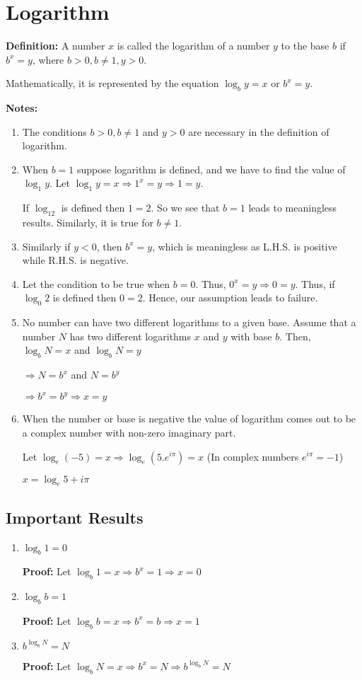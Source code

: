 \chapter{Logarithm}
\textbf{Definition:} A number $x$ is called the logarithm of a number $y$ to the base $b$ if $b^x = y$, where $b > 0, b\neq 1, y > 0$.

\noindent Mathematically, it is represented by the equation $\log_b y = x$ or $b^x = y$.

\textbf{Notes:}
\begin{enumerate}
\item The conditions $b>0, b\neq 1$ and $y>0$ are necessary in the definition of logarithm.
\item When $b=1$ suppose logarithm is defined, and we have to find the value of $\log_1y$. Let
  $\log_1y=x\Rightarrow 1^x=y\Rightarrow 1=y$.

  If $\log_12$ is defined then $1 = 2$. So we see that $b = 1$ leads to meaningless results. Similarly, it is true for $b \neq 1$.
\item Similarly if $y < 0$, then $b^x = y$, which is meaningless as L.H.S. is positive while R.H.S. is negative.
\item Let the condition to be true when $b = 0$. Thus, $0^x = y\Rightarrow 0 = y$. Thus, if $\log_0 2$ is defined then $0 =
  2$. Hence, our assumption leads to failure.
\item No number can have two different logarithms to a given base. Assume that a number $N$ has two different logarithms $x$ and
  $y$ with base $b$. Then, $\log_b N = x$ and $\log_b N = y$

  $\Rightarrow N = b^x$ and $N = b^y$

  $\Rightarrow b^x = b^y \Rightarrow x = y$
\item When the number or base is negative the value of logarithm comes out to be a complex number with non-zero imaginary part.

  Let $\log_e(-5) = x \Rightarrow \log_e(5.e^{i\pi}) = x$ (In complex numbers $e^{i\pi} = -1$)

  $x = \log_e5 + i\pi$
\end{enumerate}

\section{Important Results}
\begin{enumerate}
\item $\log_b 1 = 0$

  \textbf{Proof:} Let $\log_b 1 = x\Rightarrow b^x = 1 \Rightarrow x = 0$
\item $\log_b b = 1$

  \textbf{Proof:} Let $\log_b b = x \Rightarrow b^x = b \Rightarrow x = 1$
\item $b^{\log_b N} = N$

  \textbf{Proof:} Let $\log_b N = x\Rightarrow b^x = N \Rightarrow b^{\log_b N} = N$
\end{enumerate}
